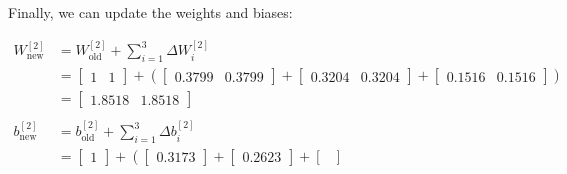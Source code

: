 \documentclass[12pt]{article}
\begin{document}
\begin{enumerate}[leftmargin=\labelsep]
\begin{paracol}{3}
          \end{paracol}

          Finally, we can update the weights and biases:

          $$
              \begin{aligned}
                  W^{[2]}_{\text{new}} & = W^{[2]}_{\text{old}} + \sum_{i=1}^{3} \Delta W^{[2]}_i \\
                                       & = \begin{bmatrix}
                                               1 & 1
                                           \end{bmatrix} + \left(
                  \begin{bmatrix}
                          0.3799 & 0.3799
                      \end{bmatrix}+
                  \begin{bmatrix}
                          0.3204 & 0.3204
                      \end{bmatrix}+
                  \begin{bmatrix}
                          0.1516 & 0.1516
                      \end{bmatrix}
                  \right)                                                                         \\
                                       & = \begin{bmatrix}
                                               1.8518 & 1.8518
                                           \end{bmatrix}
                  \\
                  \\
                  b^{[2]}_{\text{new}} & = b^{[2]}_{\text{old}} + \sum_{i=1}^{3} \Delta b^{[2]}_i \\
                                       & = \begin{bmatrix}
                                               1
                                           \end{bmatrix} + \left(
                  \begin{bmatrix}
                          0.3173
                      \end{bmatrix}+
                  \begin{bmatrix}
                          0.2623
                      \end{bmatrix}+
                  \begin{bmatrix}

\end{bmatrix}
\end{aligned}$$
\end{enumerate}
\end{document}
